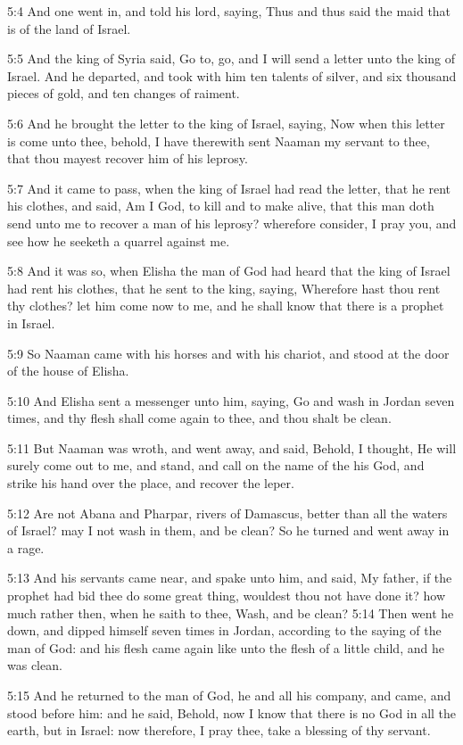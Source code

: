 5:4 And one went in, and told his lord, saying, Thus and thus said the maid that is of the land of Israel.

5:5 And the king of Syria said, Go to, go, and I will send a letter unto the king of Israel. And he departed, and took with him ten talents of silver, and six thousand pieces of gold, and ten changes of raiment.

5:6 And he brought the letter to the king of Israel, saying, Now when this letter is come unto thee, behold, I have therewith sent Naaman my servant to thee, that thou mayest recover him of his leprosy.

5:7 And it came to pass, when the king of Israel had read the letter, that he rent his clothes, and said, Am I God, to kill and to make alive, that this man doth send unto me to recover a man of his leprosy? wherefore consider, I pray you, and see how he seeketh a quarrel against me.

5:8 And it was so, when Elisha the man of God had heard that the king of Israel had rent his clothes, that he sent to the king, saying, Wherefore hast thou rent thy clothes? let him come now to me, and he shall know that there is a prophet in Israel.

5:9 So Naaman came with his horses and with his chariot, and stood at the door of the house of Elisha.

5:10 And Elisha sent a messenger unto him, saying, Go and wash in Jordan seven times, and thy flesh shall come again to thee, and thou shalt be clean.

5:11 But Naaman was wroth, and went away, and said, Behold, I thought, He will surely come out to me, and stand, and call on the name of the \LORD his God, and strike his hand over the place, and recover the leper.

5:12 Are not Abana and Pharpar, rivers of Damascus, better than all the waters of Israel? may I not wash in them, and be clean? So he turned and went away in a rage.

5:13 And his servants came near, and spake unto him, and said, My father, if the prophet had bid thee do some great thing, wouldest thou not have done it? how much rather then, when he saith to thee, Wash, and be clean?  5:14 Then went he down, and dipped himself seven times in Jordan, according to the saying of the man of God: and his flesh came again like unto the flesh of a little child, and he was clean.

5:15 And he returned to the man of God, he and all his company, and came, and stood before him: and he said, Behold, now I know that there is no God in all the earth, but in Israel: now therefore, I pray thee, take a blessing of thy servant.


